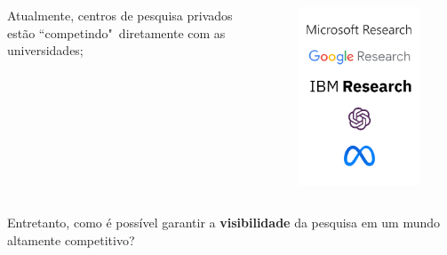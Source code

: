 \begin{frame}{}
	\begin{columns}
		\begin{column}{0.5\textwidth}
			\justify Atualmente, centros de pesquisa privados estão ``competindo"~diretamente com as universidades;	
		\end{column}
		\begin{column}{0.5\textwidth}
			\begin{figure}
				\centering
				\includegraphics[scale=0.6]{figs/private_company.png}
			\end{figure}	
		\end{column}
	\end{columns}

\end{frame}

\begin{frame}{}
	\justify Entretanto, como é possível garantir a \textbf{visibilidade} da pesquisa em um mundo altamente competitivo?
\end{frame}